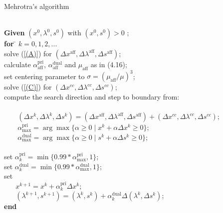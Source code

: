 \documentclass[a4paper,10 pt,titlepage,twoside]{report}
\theoremstyle{plain}
\theoremstyle{definition}
\theoremstyle{remark}
\begin{document}
\begin{algorithm}[H]\caption{Mehrotra's algorithm}
\begin{tabbing}
	\\
	\textbf{Given} $(x^{0}, \lambda^{0}, s^{0})$ with $(x^{0}, s^{0})> 0$ ; \\
	\textbf{for} \= $k = 0, 1, 2,...$ \\
	\> solve (\ref{(A)}) for $(\Delta x^{\text{aff}},\Delta \lambda^{\text{aff}},\Delta s^{\text{aff}})$;\\
	\> calculate $\alpha_{\text{aff}}^{\text{pri}}$, $\alpha_{\text{aff}}^{\text{dual}}$ and $\mu_{\text{aff}}$ as in (4.16);\\
	\> set centering parameter to $\sigma = (\mu_{\text{aff}}/\mu)^{3}$; \\
	\> solve (\ref{(C)}) for $(\Delta x^{cc},\Delta \lambda^{cc},\Delta s^{cc})$;\\
	\> compute the search direction and step to boundary from: \\
	\> \\
	\> $\;\;\;\;\;\;\;(\Delta x^{k},\Delta \lambda^{k},\Delta s^{k})=(\Delta x^{\text{aff}},\Delta \lambda^{\text{aff}},\Delta s^{\text{aff}})+(\Delta x^{cc},\Delta  \lambda^{cc},\Delta s^{cc})$;\\
	\> $\;\;\;\;\;\;\;\alpha_{\text{max}}^{\text{pri}}=\arg\max\{\alpha\geq0\;|\;x^{k} +\alpha\Delta x^{k}\geq 0\}$;\\
	\> $\;\;\;\;\;\;\;\alpha_{\text{max}}^{\text{dual}}=\arg\max\{\alpha\geq0\;|\;s^{k} +\alpha\Delta s^{k}\geq 0\}$;\\
	\>\\
	\> set $\alpha_{k}^{\text{pri}}=\min\{0.99\ast\alpha_{\text{max}}^{\text{pri}},1\}$;\\
	\> set $\alpha_{k}^{\text{dual}}=\min\{0.99\ast\alpha_{\text{max}}^{\text{dual}},1\}$;\\
	\> set\\
	\> $\;\;\;\;\;\;x^{k+1} = x^{k} + \alpha_{k}^{\text{pri}}\Delta x^{k}$;\\
	\>$\;\;\;\;\;\;(\lambda^{k+1},s^{k+1}) = (\lambda^{k},s^{k}) + \alpha_{k}^{\text{dual}}\Delta (\lambda^{k},\Delta s^{k})$;\\
\textbf{end}
\end{tabbing}
\end{algorithm}
\end{document}
